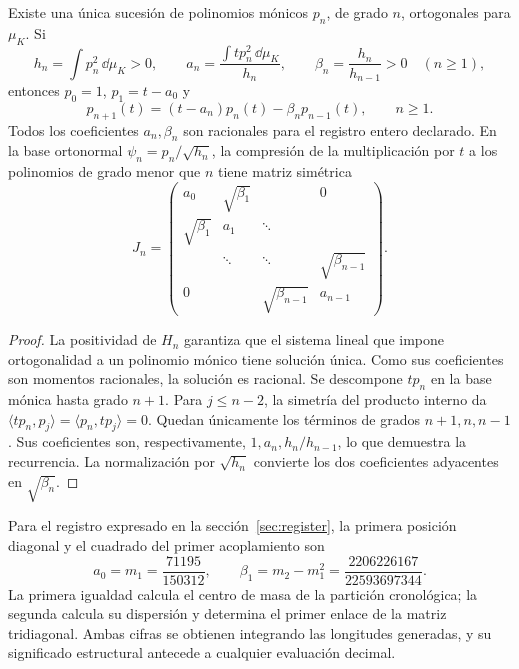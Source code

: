 \begin{theorem}
\label{thm:jacobi-recurrence}
Existe una única sucesión de polinomios mónicos \(p_n\), de grado \(n\),
ortogonales para \(\mu_K\). Si
\[
 h_n=\int p_n^2\,\dd\mu_K>0,\qquad
 a_n=\frac{\int t p_n^2\,\dd\mu_K}{h_n},\qquad
 \beta_n=\frac{h_n}{h_{n-1}}>0\quad(n\geq1),
\]
entonces \(p_0=1\), \(p_1=t-a_0\) y
\begin{equation}
 p_{n+1}(t)=(t-a_n)p_n(t)-\beta_np_{n-1}(t),\qquad n\geq1.
 \label{eq:jacobi-recurrence}
\end{equation}
Todos los coeficientes \(a_n,\beta_n\) son racionales para el registro
entero declarado. En la base ortonormal \(\psi_n=p_n/\sqrt{h_n}\),
la compresión de la multiplicación por \(t\) a los polinomios de grado
menor que \(n\) tiene matriz simétrica
\[
 J_n=\begin{pmatrix}
 a_0&\sqrt{\beta_1}&&0\\
 \sqrt{\beta_1}&a_1&\ddots&\\
 &\ddots&\ddots&\sqrt{\beta_{n-1}}\\
 0&&\sqrt{\beta_{n-1}}&a_{n-1}
 \end{pmatrix}.
\]
\end{theorem}
\begin{proof}
La positividad de \(H_n\) garantiza que el sistema lineal que impone
ortogonalidad a un polinomio mónico tiene solución única. Como sus
coeficientes son momentos racionales, la solución es racional. Se
descompone \(tp_n\) en la base mónica hasta grado \(n+1\). Para
\(j\leq n-2\), la simetría del producto interno da
\(\langle tp_n,p_j\rangle=\langle p_n,tp_j\rangle=0\).
Quedan únicamente los términos de grados \(n+1,n,n-1\). Sus
coeficientes son, respectivamente, \(1,a_n,h_n/h_{n-1}\), lo que
demuestra la recurrencia. La normalización por \(\sqrt{h_n}\)
convierte los dos coeficientes adyacentes en \(\sqrt{\beta_n}\).
\end{proof}

Para el registro expresado en la sección~\ref{sec:register}, la primera
posición diagonal y el cuadrado del primer acoplamiento son
\[
 a_0=m_1=\frac{71195}{150312},\qquad
 \beta_1=m_2-m_1^2=\frac{2206226167}{22593697344}.
\]
La primera igualdad calcula el centro de masa de la partición cronológica;
la segunda calcula su dispersión y determina el primer enlace de la
matriz tridiagonal. Ambas cifras se obtienen integrando las longitudes
generadas, y su significado estructural antecede a cualquier evaluación
decimal.


